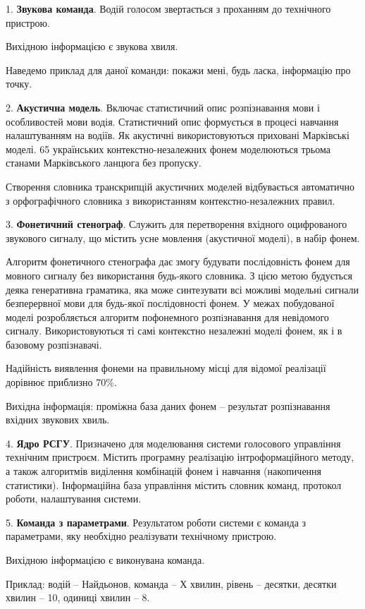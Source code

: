 1. \textbf{Звукова команда}. Водій голосом звертається з проханням до технічного пристрою.

Вихідною інформацією є звукова хвиля.

Наведемо приклад для даної команди: покажи мені, будь ласка, інформацію про точку.

2. \textbf{Акустична модель}. Включає статистичний опис розпізнавання мови і особливостей мови водія. Статистичний опис формується в процесі навчання налаштуванням на водіїв. Як акустичні використовуються приховані Марківські моделі. 65 українських контекстно-незалежних фонем моделюються трьома станами Марківського ланцюга без пропуску.

Створення словника транскрипцій акустичних моделей відбувається автоматично з орфографічного словника з використанням контекстно-незалежних правил.

3. \textbf{Фонетичний стенограф}. Служить для перетворення вхідного оцифрованого звукового сигналу, що містить усне мовлення (акустичної моделі), в набір фонем.

Алгоритм фонетичного стенографа дає змогу будувати послідовність фонем для мовного сигналу без використання будь-якого словника. З цією метою будується деяка генеративна граматика, яка може синтезувати всі можливі модельні сигнали безперервної мови для будь-якої послідовності фонем. У межах побудованої моделі розробляється алгоритм пофонемного розпiзнавання для невідомого сигналу. Використовуються ті самі контекстно незалежні моделі фонем, як і в базовому розпізнавачі.

Надійність виявлення фонеми на правильному місці для відомої реалізації дорівнює приблизно 70\%.

Вихідна інформація: проміжна база даних фонем – результат розпізнавання вхідних звукових хвиль.

4. \textbf{Ядро РСГУ}. Призначено для моделювання системи голосового управління технічним пристроєм. Містить програмну реалізацію інтроформаційного методу, а також алгоритмів виділення комбінацій фонем і навчання (накопичення статистики). Інформаційна база управління містить словник команд, протокол роботи, налаштування системи.

5. \textbf{Команда з параметрами}. Результатом роботи системи є команда з параметрами, яку необхідно реалізувати технічному пристрою.

Вихідною інформацією є виконувана команда.

Приклад: водій – Найдьонов, команда – Х хвилин, рівень – десятки, десятки хвилин – 10, одиниці хвилин – 8.

